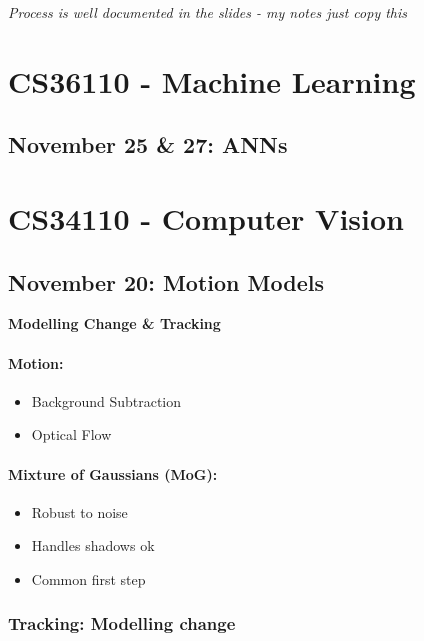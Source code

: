 \documentclass[paper=a4, fontsize=11pt]{article} %
\numberwithin{equation}{section} %
\numberwithin{figure}{section} %
\numberwithin{table}{section} %
\begin{document}
\textit{Process is well documented in the slides - my notes just copy this}




\section{CS36110 - Machine Learning}

\subsection{November 25 \& 27: ANNs}


\section{CS34110 - Computer Vision}

\subsection{November 20: Motion Models}

\textbf{Modelling Change \& Tracking}

\paragraph{Motion:}
\begin{itemize}
\item Background Subtraction
\item Optical Flow
\end{itemize}

\paragraph{Mixture of Gaussians (MoG):}
\begin{itemize}
\item Robust to noise
\item Handles shadows ok
\item Common first step
\end{itemize}

\subsubsection{Tracking: Modelling change}
\end{document}
